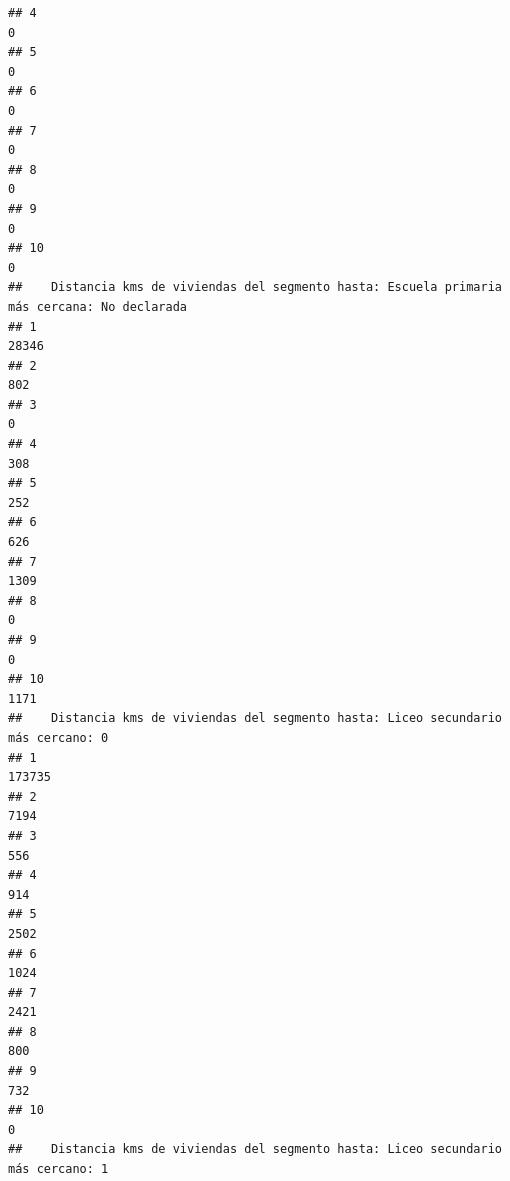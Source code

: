 \documentclass[11pt,]{article}
\begin{document}
\begin{verbatim}
## 4                                                                                0
## 5                                                                                0
## 6                                                                                0
## 7                                                                                0
## 8                                                                                0
## 9                                                                                0
## 10                                                                               0
##    Distancia kms de viviendas del segmento hasta: Escuela primaria más cercana: No declarada
## 1                                                                                      28346
## 2                                                                                        802
## 3                                                                                          0
## 4                                                                                        308
## 5                                                                                        252
## 6                                                                                        626
## 7                                                                                       1309
## 8                                                                                          0
## 9                                                                                          0
## 10                                                                                      1171
##    Distancia kms de viviendas del segmento hasta: Liceo secundario más cercano: 0
## 1                                                                          173735
## 2                                                                            7194
## 3                                                                             556
## 4                                                                             914
## 5                                                                            2502
## 6                                                                            1024
## 7                                                                            2421
## 8                                                                             800
## 9                                                                             732
## 10                                                                              0
##    Distancia kms de viviendas del segmento hasta: Liceo secundario más cercano: 1

\end{verbatim}
\end{document}
